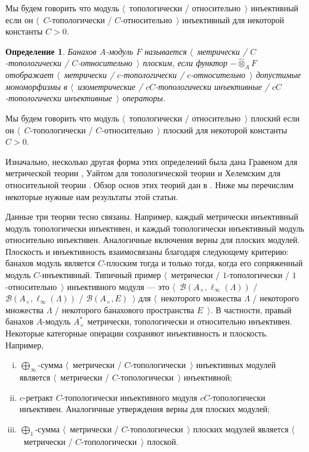 \documentclass[12pt]{article}
\newtheorem{definition}[theorem]{Определение}
\newcommand{\projtens}{\mathbin{\widehat{\otimes}}}
\begin{document}
Мы будем говорить что модуль $\langle$~топологически / относительно~$\rangle$ инъективный если он $\langle$~$C$-топологически / $C$-относительно~$\rangle$ инъективный для некоторой константы $C>0$.

\begin{definition} Банахов $A$-модуль $F$ называется \emph{$\langle$~метрически / $C$-топологически / $C$-относительно~$\rangle$ плоским}, если функтор $-\projtens_A F$ отображает $\langle$~метрически / $c$-топологически / $c$-относительно~$\rangle$ допустимые мономорфизмы в $\langle$~изометрические / $cC$-топологически инъективные / $cC$-топологически инъективные~$\rangle$ операторы.
\end{definition}

Мы будем говорить что модуль $\langle$~топологически / относительно~$\rangle$ плоский если он $\langle$~$C$-топологически / $C$-относительно~$\rangle$ плоский для некоторой константы $C>0$.

Изначально, несколько другая форма этих определений была дана Гравеном для метрической теории \cite{GravInjProjBanMod}, Уайтом для топологической теории \cite{WhiteInjmoduAlg} и Хелемским для относительной теории \cite{HelemHomolDimNorModBanAlg}. Обзор основ этих теорий дан в \cite{NemGeomProjInjFlatBanMod}. Ниже мы перечислим некоторые нужные нам результаты этой статьи.

Данные три теории тесно связаны. Например, каждый метрически инъективный модуль топологически инъективен, и каждый топологически инъективный модуль относительно инъективен. Аналогичные включения верны для плоских модулей. Плоскость и инъективность взаимосвязаны благодаря следующему критерию: банахов модуль является $C$-плоским тогда и только тогда, когда его сопряженный модуль $C$-инъективный. Типичный пример $\langle$~метрически / $1$-топологически / $1$-относительно~$\rangle$ инъективного модуля --- это $\langle$~$\mathcal{B}(A_\times, \ell_\infty(\Lambda))$ / $\mathcal{B}(A_\times, \ell_\infty(\Lambda))$ / $\mathcal{B}(A_\times, E)$~$\rangle$ для $\langle$~некоторого множества $\Lambda$ / некоторого множества $\Lambda$ / некоторого банахового пространства $E$~$\rangle$. В частности, правый банахов $A$-модуль $A_\times^*$ метрически, топологически и относительно инъективен. Некоторые категорные операции сохраняют инъективность и плоскость. Например, 
\begin{enumerate}[i)]
\item $\bigoplus_\infty$-сумма $\langle$~метрически / $C$-топологически~$\rangle$ инъективных модулей является $\langle$~метрически / $C$-топологически~$\rangle$ инъективной;

\item $c$-ретракт $C$-топологически инъективного модуля $cC$-топологически инъективен. Аналогичные утверждения верны для плоских модулей;

\item $\bigoplus_1$-сумма $\langle$~метрически / $C$-топологически~$\rangle$ плоских модулей является $\langle$~метрически / $C$-топологически~$\rangle$ плоской.
\end{enumerate}
\end{document}
